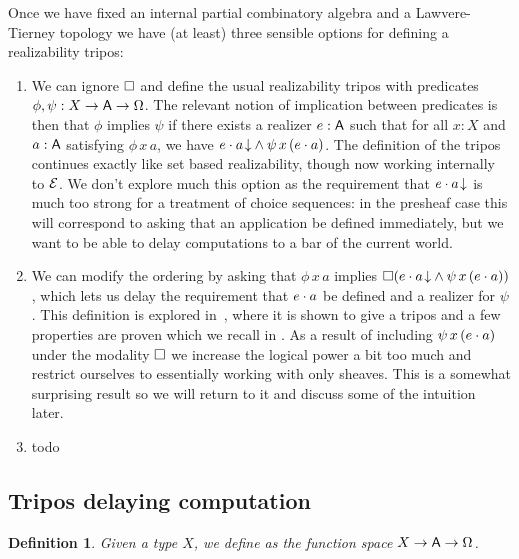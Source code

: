 \documentclass[11pt]{article}
\newtheorem{defn}[thrm]{Definition}
\begin{document}
Once we have fixed an internal partial combinatory algebra and a Lawvere-Tierney
topology we have (at least) three sensible options for defining a realizability
tripos:
\begin{enumerate}
  \item We can ignore \(\Box\) and define the usual realizability tripos
    with predicates \(\phi,\psi:{{X}\to{{{\ensuremath{\mathsf{A}}}\to{\Omega}}}}\).
    The relevant notion of implication between predicates is then that \(\phi\)
    implies \(\psi\) if there exists a realizer \(e:\mathsf{A}\) such that for all
    \(x:X\) and \(a:\mathsf{A}\) satisfying \(\phi\,x\,a\), we have
    \({{{{e}\cdot{a}}\!\downarrow}}\land{\psi\,x\,({e}\cdot{a})}\).
    The definition of the tripos continues exactly like set based realizability,
    though now working internally to \(\mathcal{E}\).
    We don't explore much this option as the requirement that
    \({{{e}\cdot{a}}\!\downarrow}\) is much too strong for a treatment of choice
    sequences: in the presheaf case this will correspond to asking that an
    application be defined immediately, but we want to be able to delay
    computations to a bar of the current world.

  \item We can modify the ordering by asking that \(\phi\,x\,a\) implies
    \(\Box{({{{{e}\cdot{a}}\!\downarrow}}\land{\psi\,x\,({e}\cdot{a})})}\), which lets
    us delay the requirement that \({e}\cdot{a}\) be defined and a realizer for
    \(\psi\).
    This definition is explored in~\cite{vanoostenExercisesRealizability2018},
    where it is shown to give a tripos and a few properties are proven which we
    recall in .
    As a result of including \(\psi\,x\,({e}\cdot{a})\) under the modality
    \(\Box\) we increase the logical power a bit too much and restrict
    ourselves to essentially working with only sheaves.
    This is a somewhat surprising result so we will return to it and discuss
    some of the intuition later.

  \item todo


\end{enumerate}

\subsection{Tripos delaying computation}

\begin{defn}\label{defn:tripos-predicates}
  Given a type \(X\), we define  as the function space \({{X}\to{{{\ensuremath{\mathsf{A}}}\to{\Omega}}}}\).
\end{defn}
\end{document}
